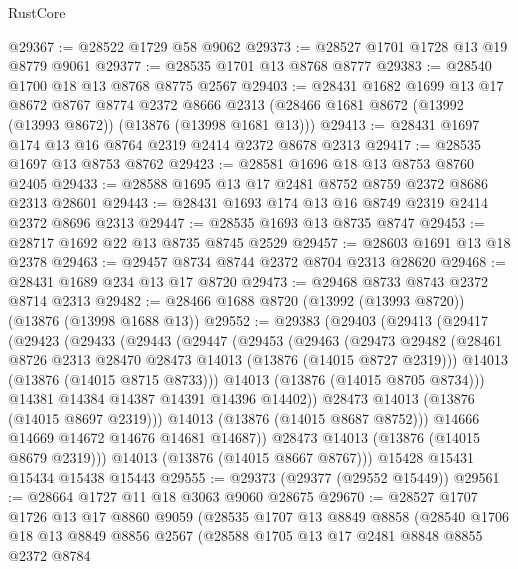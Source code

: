 \begin{lexlean}{RustCore}
\begin{coremodule}
@29367 := @28522 @1729 @58 @9062
@29373 := @28527 @1701 @1728 @13 @19 @8779 @9061
@29377 := @28535 @1701 @13 @8768 @8777
@29383 := @28540 @1700 @18 @13 @8768 @8775 @2567
@29403 := @28431
    @1682
    @1699
    @13
    @17
    @8672
    @8767
    @8774
    @2372
    @8666
    @2313
    (@28466 @1681 @8672 (@13992 (@13993 @8672)) (@13876 (@13998 @1681 @13)))
@29413 := @28431 @1697 @174 @13 @16 @8764 @2319 @2414 @2372 @8678 @2313
@29417 := @28535 @1697 @13 @8753 @8762
@29423 := @28581 @1696 @18 @13 @8753 @8760 @2405
@29433 := @28588 @1695 @13 @17 @2481 @8752 @8759 @2372 @8686 @2313 @28601
@29443 := @28431 @1693 @174 @13 @16 @8749 @2319 @2414 @2372 @8696 @2313
@29447 := @28535 @1693 @13 @8735 @8747
@29453 := @28717 @1692 @22 @13 @8735 @8745 @2529
@29457 := @28603 @1691 @13 @18 @2378
@29463 := @29457 @8734 @8744 @2372 @8704 @2313 @28620
@29468 := @28431 @1689 @234 @13 @17 @8720
@29473 := @29468 @8733 @8743 @2372 @8714 @2313
@29482 := @28466 @1688 @8720 (@13992 (@13993 @8720)) (@13876 (@13998 @1688 @13))
@29552 := @29383
    (@29403
      (@29413
        (@29417
          (@29423
            (@29433
              (@29443
                (@29447
                  (@29453
                    (@29463
                      (@29473
                        @29482
                        (@28461 @8726 @2313 @28470 @28473 @14013 (@13876 (@14015 @8727 @2319)))
                        @14013
                        (@13876 (@14015 @8715 @8733)))
                      @14013
                      (@13876 (@14015 @8705 @8734)))
                    @14381
                    @14384
                    @14387
                    @14391
                    @14396
                    @14402))
                @28473
                @14013
                (@13876 (@14015 @8697 @2319)))
              @14013
              (@13876 (@14015 @8687 @8752)))
            @14666
            @14669
            @14672
            @14676
            @14681
            @14687))
        @28473
        @14013
        (@13876 (@14015 @8679 @2319)))
      @14013
      (@13876 (@14015 @8667 @8767)))
    @15428
    @15431
    @15434
    @15438
    @15443
@29555 := @29373 (@29377 (@29552 @15449))
@29561 := @28664 @1727 @11 @18 @3063 @9060 @28675
@29670 := @28527
    @1707
    @1726
    @13
    @17
    @8860
    @9059
    (@28535
      @1707
      @13
      @8849
      @8858
      (@28540
        @1706
        @18
        @13
        @8849
        @8856
        @2567
        (@28588
          @1705
          @13
          @17
          @2481
          @8848
          @8855
          @2372
          @8784

\end{coremodule}
\end{lexlean}
